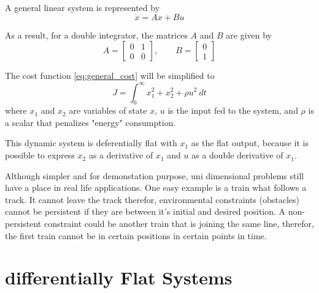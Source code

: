 \par A general linear system is represented by
\begin{equation}
    \dot{x} = Ax + Bu
    \label{eq:general_state_space}
\end{equation}

\par As a result, for a double integrator, the matrices $A$ and $B$ are given by
\begin{equation}
    A = \begin{bmatrix} 0 & 1 \\ 0 & 0 \end{bmatrix}, \qquad B = \begin{bmatrix} 0 \\ 1 \end{bmatrix}
    \label{eq:A_and_B}
\end{equation}

\par The cost function \ref{eq:general_cost} will be simplified to
\begin{equation}
    J = \int_0^\infty x_1^2 + x_2^2 + \rho u^2\  dt
    \label{eq:my_cost}
\end{equation}
where $x_1$ and $x_2$ are variables of state $x$, $u$ is the input fed to the system, and $\rho$ is a scalar that penalizes "energy" consumption.
\par This dynamic system is deferentially flat with $x_1$ as the flat output, because it is possible to express $x_2$ as a derivative of $x_1$ and $u$ as a double derivative of $x_1$.

\par Although simpler and for demonstation purpose, uni dimensional problems still have a place in real life applications. One easy example is a train what follows a track. It cannot leave the track therefor, environmental constraints (obstacles) cannot be persistent if they are between it's initial and desired position. A non-persistent constraint could be another train that is joining the same line, therefor, the first train cannot be in certain positions in certain points in time. 

\section{differentially Flat Systems}

